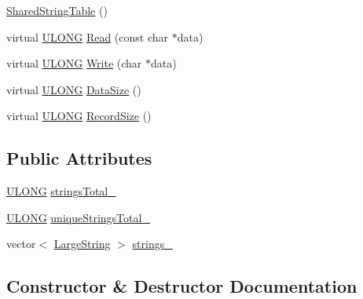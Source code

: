 \begin{DoxyCompactItemize}
\item 
\hyperlink{struct_y_excel_1_1_workbook_1_1_shared_string_table_a0f9539d162d23bbf8bca9766cdb6aafc}{Shared\+String\+Table} ()
\item 
virtual \hyperlink{_basic_excel_8hpp_abe09d1bea023be6a07cbadde8e955435}{U\+L\+O\+N\+G} \hyperlink{struct_y_excel_1_1_workbook_1_1_shared_string_table_a0489d306ba17ad670ad03c8f352c7857}{Read} (const char $\ast$data)
\item 
virtual \hyperlink{_basic_excel_8hpp_abe09d1bea023be6a07cbadde8e955435}{U\+L\+O\+N\+G} \hyperlink{struct_y_excel_1_1_workbook_1_1_shared_string_table_a9147be0023e5bcfd96e97950e9aecf75}{Write} (char $\ast$data)
\item 
virtual \hyperlink{_basic_excel_8hpp_abe09d1bea023be6a07cbadde8e955435}{U\+L\+O\+N\+G} \hyperlink{struct_y_excel_1_1_workbook_1_1_shared_string_table_a2698571633a57a3eafd2e7aa8b00d948}{Data\+Size} ()
\item 
virtual \hyperlink{_basic_excel_8hpp_abe09d1bea023be6a07cbadde8e955435}{U\+L\+O\+N\+G} \hyperlink{struct_y_excel_1_1_workbook_1_1_shared_string_table_a88d3c4379d27718da4566526a4b0c4d9}{Record\+Size} ()
\end{DoxyCompactItemize}
\subsection*{Public Attributes}
\begin{DoxyCompactItemize}
\item 
\hyperlink{_basic_excel_8hpp_abe09d1bea023be6a07cbadde8e955435}{U\+L\+O\+N\+G} \hyperlink{struct_y_excel_1_1_workbook_1_1_shared_string_table_a6fc099c9ca9a2286614a57b1415d0b8b}{strings\+Total\+\_\+}
\item 
\hyperlink{_basic_excel_8hpp_abe09d1bea023be6a07cbadde8e955435}{U\+L\+O\+N\+G} \hyperlink{struct_y_excel_1_1_workbook_1_1_shared_string_table_ab4ec90981247df53fa63f719dafc0b55}{unique\+Strings\+Total\+\_\+}
\item 
vector$<$ \hyperlink{struct_y_excel_1_1_large_string}{Large\+String} $>$ \hyperlink{struct_y_excel_1_1_workbook_1_1_shared_string_table_a89a0c5de6706ee57c2dab0c6da08237a}{strings\+\_\+}
\end{DoxyCompactItemize}


\subsection{Constructor \& Destructor Documentation}
\hypertarget{struct_y_excel_1_1_workbook_1_1_shared_string_table_a0f9539d162d23bbf8bca9766cdb6aafc}{}

